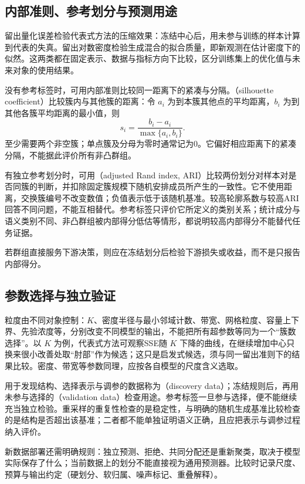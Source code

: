 \subsection{内部准则、参考划分与预测用途}

留出量化误差检验代表式方法的压缩效果：冻结中心后，用未参与训练的样本计算到代表的失真。留出对数密度检验生成混合的拟合质量，即新观测在估计密度下的似然。这两类都在固定表示、数据与指标方向下比较，区分训练集上的优化值与未来对象的使用结果。

没有参考标签时，可用内部准则比较同一距离下的紧凑与分隔。（silhouette coefficient）比较簇内与其他簇的距离：令 $a_i$ 为到本簇其他点的平均距离，$b_i$ 为到其他各簇平均距离的最小值，则
\[
 s_i=\frac{b_i-a_i}{\max\{a_i,b_i\}}.
\]
至少需要两个非空簇；单点簇及分母为零时通常记为0。它偏好相应距离下的紧凑分隔，不能据此评价所有非凸群组。

有独立参考划分时，可用（adjusted Rand index, ARI）比较两份划分对样本对是否同簇的判断，并扣除固定簇规模下随机安排成员所产生的一致性。它不使用距离，交换簇编号不改变数值；负值表示低于该随机基准。较高轮廓系数与较高ARI回答不同问题，不能互相替代。参考标签只评价它所定义的类别关系；统计成分与语义类别不同、非凸群组被内部得分低估等情形，都说明较高内部得分不能替代任务证据。

若群组直接服务下游决策，则应在冻结划分后检验下游损失或收益，而不是只报告内部得分。

\subsection{参数选择与独立验证}

粒度由不同对象控制：$K$、密度半径与最小邻域计数、带宽、网格粒度、容量上下界、先验浓度等，分别改变不同模型的输出，不能把所有超参数等同为一个“簇数选择”。以 $K$ 为例，代表式方法可观察SSE随 $K$ 下降的曲线，在继续增加中心只换来很小改善处取“肘部”作为候选；这只是启发式候选，须与同一留出准则下的结果比较。密度、带宽等参数同理，应按各自模型的尺度含义选取。

用于发现结构、选择表示与调参的数据称为（discovery data）；冻结规则后，再用未参与选择的（validation data）检查用途。参考标签一旦参与选择，便不能继续充当独立检验。重采样的重复性检查的是稳定性，与明确的随机生成基准比较检查的是结构是否超出该基准；二者都不能单独证明语义正确，且应把表示与调参过程纳入评价。

新数据部署还需明确规则：独立预测、拒绝、共同分配还是重新聚类，取决于模型实际保存了什么；当前数据上的划分不能直接视为通用预测器。比较时记录尺度、预算与输出约定（硬划分、软归属、噪声标记、重叠解释）。


